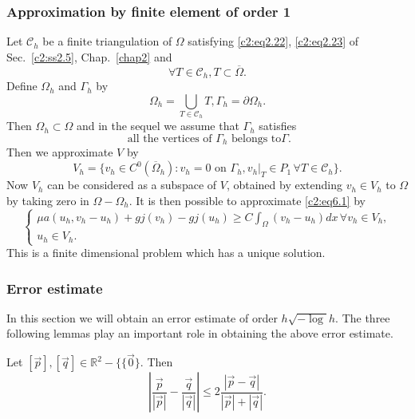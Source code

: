 \subsubsection{Approximation by finite element of order 1}\label{c2:sss6.8.2} 
Let $\mathscr{C}_h$ be a finite triangulation of $\Omega$ satisfying
\eqref{c2:eq2.22}, \eqref{c2:eq2.23} of Sec.~\ref{c2:ss2.5},
Chap.~\ref{chap2} and   
\begin{equation}
\forall T \in \mathscr{C}_h, T \subset
\overline{\Omega}. \tag{6.55}\label{c2:eq6.55} 
\end{equation}
Define $\Omega_h$ and $\Gamma_h$ by 
$$
\Omega_h = \bigcup_{T \in \mathscr{C}_h} T, \Gamma_h = \partial
\Omega_h. 
$$
Then $\Omega_h \subset \Omega $ and in the sequel we assume that
$\Gamma_h$ satisfies  
\begin{equation}
\text{ all the vertices of $\Gamma_h$ belongs to
}\Gamma.\tag{6.56}\label{c2:eq6.56}  
\end{equation}
Then we approximate $V$ by 
$$
V_h = \{v_h \in C^0 (\overline{\Omega}_h) : v_h = 0 \text{ on }
\Gamma_h, v_h |_T \in P_1\, \forall  T \in \mathscr{C}_h \}. 
$$
Now $V_h$ can be considered as  a subspace of $V$, obtained by
extending $v_h \in V_h$ to $\Omega$ by taking zero in $\Omega -
\Omega_h$. It is then possible to approximate \eqref{c2:eq6.1} by  
\begin{equation}
\begin{cases}
\mu a (u_h, v_h -u_h) + gj (v_h) - gj (u_h) \geq C \int_\Omega (v_h
-u_h) dx\, \forall  v_h \in V_h,\\ 
u_h \in V_h. 
\end{cases}
\tag{6.57}\label{c2:eq6.57}
\end{equation}\pageoriginale 
This is a finite dimensional problem which has a unique solution. 

\subsubsection{Error estimate}\label{c2:sss6.8.3}
In this section we will obtain an error estimate of order $h
\sqrt{-\log}h$. The three following lemmas play an important role in
obtaining the above error estimate. 

\begin{lemma}\label{c2:lem6.1}%
Let $[\overrightarrow{p}], [\overrightarrow{q}] \in \mathbb{R}^2 - \{
\{\overrightarrow{0}\}$. Then  
\begin{equation}
\left| \frac{ \overrightarrow{p} }{|\overrightarrow{p}|}-
\frac{\overrightarrow{q}}{|\overrightarrow{q}|}\right| \leq 2
\frac{|\overrightarrow{p}- \overrightarrow{q}|}{|\overrightarrow{p}|+
  |\overrightarrow{q}|}. \tag{6.58}\label{c2:eq6.58} 
\end{equation}
\end{lemma}

